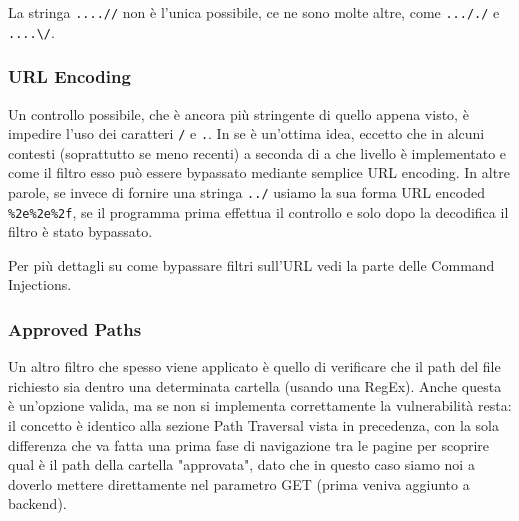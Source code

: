 \documentclass[12pt,a4paper]{report}
\begin{document}
	\begin{nota}
		La stringa \texttt{....//} non è l'unica possibile, ce ne sono molte altre, come \texttt{..././} e \verb|....\/|.
	\end{nota}
	
	\subsubsection{URL Encoding}
	Un controllo possibile, che è ancora più stringente di quello appena visto, è impedire l'uso dei caratteri \texttt{/} e \texttt{.}. In se è un'ottima idea, eccetto che in alcuni contesti (soprattutto se meno recenti) a seconda di a che livello è implementato e come il filtro esso può essere bypassato mediante semplice URL encoding. In altre parole, se invece di fornire una stringa \texttt{../} usiamo la sua forma URL encoded \texttt{\%2e\%2e\%2f}, se il programma prima effettua il controllo e solo dopo la decodifica il filtro è stato bypassato.
	
	\begin{nota}
		Per più dettagli su come bypassare filtri sull'URL vedi la parte delle Command Injections.
	\end{nota}
	
	\subsubsection{Approved Paths}
	Un altro filtro che spesso viene applicato è quello di verificare che il path del file richiesto sia dentro una determinata cartella (usando una RegEx). Anche questa è un'opzione valida, ma se non si implementa correttamente la vulnerabilità resta: il concetto è identico alla sezione Path Traversal vista in precedenza, con la sola differenza che va fatta una prima fase di navigazione tra le pagine per scoprire qual è il path della cartella "approvata", dato che in questo caso siamo noi a doverlo mettere direttamente nel parametro GET (prima veniva aggiunto a backend).
	
\end{document}
